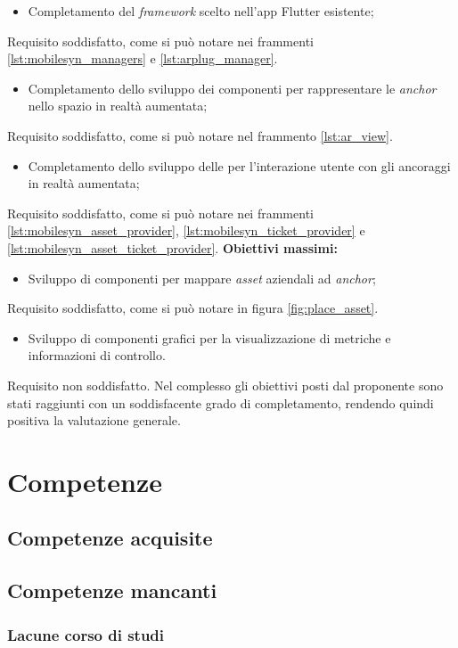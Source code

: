 \begin{itemize}
  \item Completamento del \textit{framework} scelto nell'app Flutter esistente;
\end{itemize}

Requisito soddisfatto, come si può notare nei frammenti \ref{lst:mobilesyn_managers} e \ref{lst:arplug_manager}.

\begin{itemize}
  \item Completamento dello sviluppo dei componenti per rappresentare le \textit{anchor} nello spazio in realtà aumentata;
\end{itemize}

Requisito soddisfatto, come si può notare nel frammento \ref{lst:ar_view}.

\begin{itemize}
  \item Completamento dello sviluppo delle \api{} per l'interazione utente con gli ancoraggi in realtà aumentata;
\end{itemize}

Requisito soddisfatto, come si può notare nei frammenti \ref{lst:mobilesyn_asset_provider}, \ref{lst:mobilesyn_ticket_provider} e \ref{lst:mobilesyn_asset_ticket_provider}.
\aCapo{}
\textbf{Obiettivi massimi:}

\begin{itemize}
  \item Sviluppo di componenti per mappare \textit{asset} aziendali ad \textit{anchor};
\end{itemize}

Requisito soddisfatto, come si può notare in figura \ref{fig:place_asset}.

\begin{itemize}
  \item Sviluppo di componenti grafici per la visualizzazione di metriche e informazioni di controllo.
\end{itemize}

Requisito non soddisfatto.\aCapo{}
Nel complesso gli obiettivi posti dal proponente sono stati raggiunti con un soddisfacente grado di completamento, rendendo quindi positiva la valutazione generale.

\section{Competenze}
\subsection{Competenze acquisite}
\subsection{Competenze mancanti}
\subsubsection{Lacune corso di studi}
